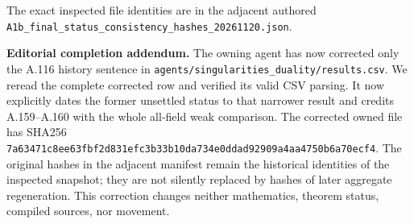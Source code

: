 The exact inspected file identities are in the adjacent authored
\texttt{A1b\_final\_status\_consistency\_hashes\_20261120.json}.

\textbf{Editorial completion addendum.}\quad
The owning agent has now corrected only the A.116 history sentence in
\texttt{agents/singularities\_duality/results.csv}.  We reread the
complete corrected row and verified its valid CSV parsing.  It now
explicitly dates the former unsettled status to that narrower result
and credits A.159--A.160 with the whole all-field weak comparison.
The corrected owned file has SHA256
\texttt{7a63471c8ee63fbf2d831efc3b33b10da734e0ddad92909a4aa4750b6a70ecf4}.
The original hashes in the adjacent manifest remain the historical
identities of the inspected snapshot; they are not silently replaced
by hashes of later aggregate regeneration.  This correction changes
neither mathematics, theorem status, compiled sources, nor movement.
